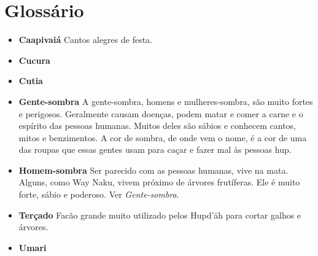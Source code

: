 \chapter{Glossário}

\begin{itemize}
\item\formular\textbf{Caapivaiá} Cantos alegres de festa.

\item\formular\textbf{Cucura} 

\item\formular\textbf{Cutia} 

\item\formular\textbf{Gente-sombra} A gente-sombra, homens e mulheres-sombra, são
muito fortes e perigosos. Geralmente causam doenças, podem matar
e comer a carne e o espírito das pessoas humanas. Muitos deles
são sábios e conhecem cantos, mitos e benzimentos. A cor de
sombra, de onde vem o nome, é a cor de uma das roupas que essas gentes
usam para caçar e fazer mal às pessoas hup.

\item\formular\textbf{Homem-sombra} Ser parecido com as pessoas
humanas, vive na mata. Alguns, como Way Naku, vivem próximo de árvores frutíferas. Ele
é muito forte, sábio e poderoso. Ver \textit{Gente-sombra}.

\item\formular\textbf{Terçado} Facão grande muito utilizado pelos Hupd’äh para cortar
galhos e árvores.

\item\formular\textbf{Umari} 
\end{itemize}

